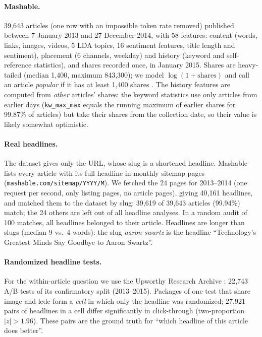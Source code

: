 \documentclass[10pt,a4paper,twocolumn]{article}
\begin{document}
\paragraph{Mashable.} 39{,}643 articles (one row with an impossible token rate removed) published between
7 January 2013 and 27 December 2014, with 58 features: content (words, links, images, videos, 5 LDA topics, 16
sentiment features, title length and sentiment), placement (6 channels, weekday) and history (keyword and
self-reference statistics), and shares recorded once, in January 2015. Shares are heavy-tailed (median 1{,}400,
maximum 843{,}300); we model $\log(1{+}\text{shares})$ and call an article \emph{popular} if it has at least
1{,}400 shares \citep{fernandes2015}. The history features are computed from \emph{other} articles' shares: the
keyword statistics use only articles from earlier days (\texttt{kw\_max\_max} equals the running maximum of earlier
shares for 99.87\% of articles) but take their shares from the collection date, so their value is likely somewhat
optimistic.

\paragraph{Real headlines.} The dataset gives only the URL, whose slug is a shortened headline. Mashable lists
every article with its full headline in monthly sitemap pages (\texttt{mashable.com/sitemap/YYYY/M}). We fetched the
24 pages for 2013--2014 (one request per second, only listing pages, no article pages), giving 40{,}161
headlines, and matched them to the dataset by slug: 39{,}619 of 39{,}643 articles (99.94\%) match; the 24 others
are left out of all headline analyses. In a random audit of 100 matches, all headlines belonged to their article.
Headlines are longer than slugs (median 9 vs.\ 4 words): the slug \emph{aaron-swartz} is the headline ``Technology's
Greatest Minds Say Goodbye to Aaron Swartz''.

\paragraph{Randomized headline tests.} For the within-article question we use the Upworthy Research Archive
\citep{matias2021}: 22{,}743 A/B tests of its confirmatory split (2013--2015). Packages of one test that share image
and lede form a \emph{cell} in which only the headline was randomized; 27{,}921 pairs of headlines in a cell differ
significantly in click-through (two-proportion $|z|>1.96$). These pairs are the ground truth for ``which headline
of this article does better''.
\end{document}
